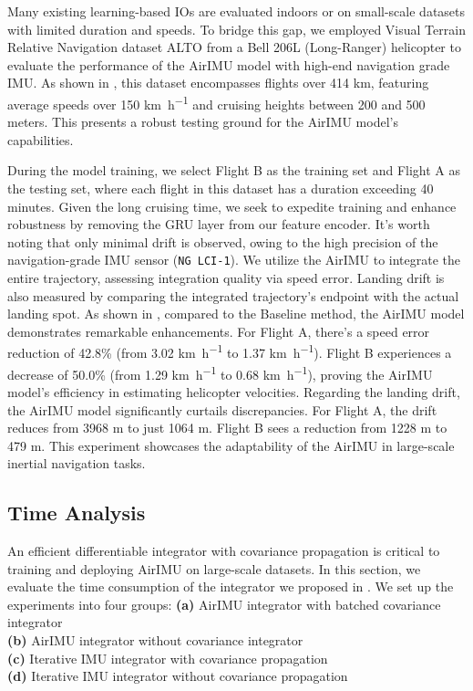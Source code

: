 Many existing learning-based IOs are evaluated indoors or on small-scale datasets with limited duration and speeds. 
To bridge this gap, we employed Visual Terrain Relative Navigation dataset ALTO\cite{cisneros2022alto} from a Bell 206L (Long-Ranger) helicopter to evaluate the performance of the AirIMU model with high-end navigation grade IMU. 
As shown in , this dataset encompasses flights over 414 km, featuring average speeds over 150 \si{\km\per\hour} and cruising heights between 200 and 500 meters. This presents a robust testing ground for the AirIMU model's capabilities.

During the model training, we select Flight B as the training set and Flight A as the testing set, where each flight in this dataset has a duration exceeding 40 minutes. 
Given the long cruising time, we seek to expedite training and enhance robustness by removing the GRU layer from our feature encoder. 
It's worth noting that only minimal drift is observed, owing to the high precision of the navigation-grade IMU sensor (\texttt{NG LCI-1}).
We utilize the AirIMU to integrate the entire trajectory, assessing integration quality via speed error. 
Landing drift is also measured by comparing the integrated trajectory's endpoint with the actual landing spot. 
As shown in , compared to the Baseline method, the AirIMU model demonstrates remarkable enhancements. For Flight A, there's a speed error reduction of 42.8\% (from 3.02 \si{\km\per\hour} to 1.37 \si{\km\per\hour}). Flight B experiences a decrease of 50.0\% (from 1.29 \si{\km\per\hour} to 0.68 \si{\km\per\hour}), proving the AirIMU model's efficiency in estimating helicopter velocities.
Regarding the landing drift, the AirIMU model significantly curtails discrepancies. For Flight A, the drift reduces from 3968 \si{\meter} to just 1064 \si{\meter}. Flight B sees a reduction from 1228 \si{\meter} to 479 \si{\meter}. This experiment showcases the adaptability of the AirIMU in large-scale inertial navigation tasks.


\subsection{Time Analysis}\label{Exp: Time}
An efficient differentiable integrator with covariance propagation is critical to training and deploying AirIMU on large-scale datasets. 
In this section, we evaluate the time consumption of the integrator we proposed in . 
We set up the experiments into four groups:
\noindent\textbf{(a)} AirIMU integrator with batched covariance integrator\\
\textbf{(b)} AirIMU integrator without covariance integrator\\
\textbf{(c)} Iterative IMU integrator with covariance propagation\\
\textbf{(d)} Iterative IMU integrator without covariance propagation

